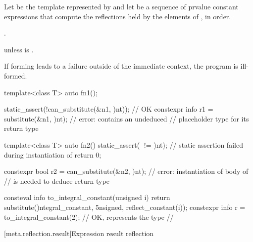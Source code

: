 \begin{itemdescr}
\pnum
Let  be the template represented by 
and let  be a sequence of prvalue constant expressions
that compute the reflections held by the elements of ,
in order.

\pnum
\returns
{}.

\pnum
\throws
{} unless
 is .

\pnum
\begin{note}
If forming  leads to a failure outside of the immediate context,
the program is ill-formed.
\end{note}

\pnum
\begin{example}
\begin{codeblock}
template<class T>
  auto fn1();

static_assert(!can_substitute(^^fn1, {^^int}));         // OK
constexpr info r1 = substitute(^^fn1, {^^int});         // error:  contains an undeduced
                                                        // placeholder type for its return type

template<class T>
  auto fn2() {
    static_assert(^^T != ^^int);    // static assertion failed during instantiation of 
    return 0;
  }

constexpr bool r2 = can_substitute(^^fn2, {^^int});     // error: instantiation of body of 
                                                        // is needed to deduce return type
\end{codeblock}
\end{example}

\pnum
\begin{example}
\begin{codeblock}
consteval info to_integral_constant(unsigned i) {
  return substitute(^^integral_constant, {^^unsigned, reflect_constant(i)});
}
constexpr info r = to_integral_constant(2);     // OK,  represents the type
                                                // 
\end{codeblock}
\end{example}
\end{itemdescr}

[meta.reflection.result]{Expression result reflection}

